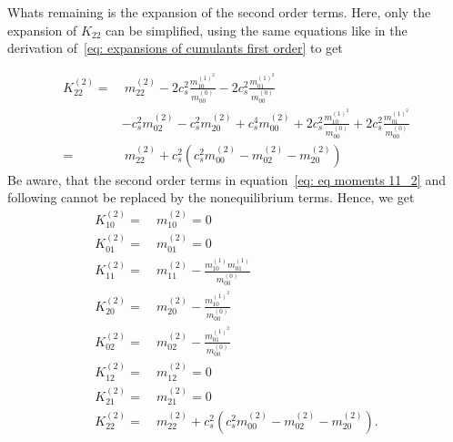 Whats remaining is the expansion of the second order terms.
Here, only the expansion of $K_{22}$ can be simplified, using the same equations like in the derivation of~\eqref{eq: expansions of cumulants first order} to get

\begin{equation}
  \begin{aligned}
    K_{22}^{(2)}
    = &\
    m_{22}^{(2)}
    - 2 c_s^2 \frac{ m_{10}^{{(1)}^2} }{m_{00}^{(0)}}
    - 2 c_s^2 \frac{ m_{01}^{{(1)}^2} }{m_{00}^{(0)}}
    \\&
    - c_s^2 m_{02}^{(2)}
    - c_s^2 m_{20}^{(2)}
    + c_s^4 m_{00}^{(2)}
    + 2 c_s^2\frac{ m_{10}^{{(1)}^2} }{m_{00}^{(0)}}
    + 2 c_s^2\frac{ m_{01}^{{(1)}^2} }{m_{00}^{(0)}}
    \\= &\
    m_{22}^{(2)}
    + c_s^2\left(c_s^2 m_{00}^{(2)}
    - m_{02}^{(2)}
    - m_{20}^{(2)}
    \right)
  \end{aligned}
\end{equation}
Be aware, that the second order terms in equation~\eqref{eq: eq moments 11_2} and following cannot be replaced by the nonequilibrium terms.
Hence, we get
\begin{equation}
  \label{eq: expansions of cumulants second order}
  \begin{aligned}
    K_{10}^{(2)} =&\ m_{10}^{(2)} = 0\\
    K_{01}^{(2)} =&\ m_{01}^{(2)} = 0\\
    K_{11}^{(2)} =&\ m_{11}^{(2)} - \frac{ m_{10}^{(1)}m_{01}^{(1)}}{m_{00}^{(0)}} \\
    K_{20}^{(2)} =&\ m_{20}^{(2)} - \frac{ m_{10}^{{(1)}^2}}{m_{00}^{(0)}} \\
    K_{02}^{(2)} =&\ m_{02}^{(2)} - \frac{ m_{01}^{{(1)}^2}}{m_{00}^{(0)}} \\
    K_{12}^{(2)} =&\ m_{12}^{(2)} = 0\\
    K_{21}^{(2)} =&\ m_{21}^{(2)} = 0\\
    K_{22}^{(2)} =&\
    m_{22}^{(2)}
    + c_s^2\left(c_s^2 m_{00}^{(2)}
    - m_{02}^{(2)}
    - m_{20}^{(2)}
    \right).
  \end{aligned}
\end{equation}
